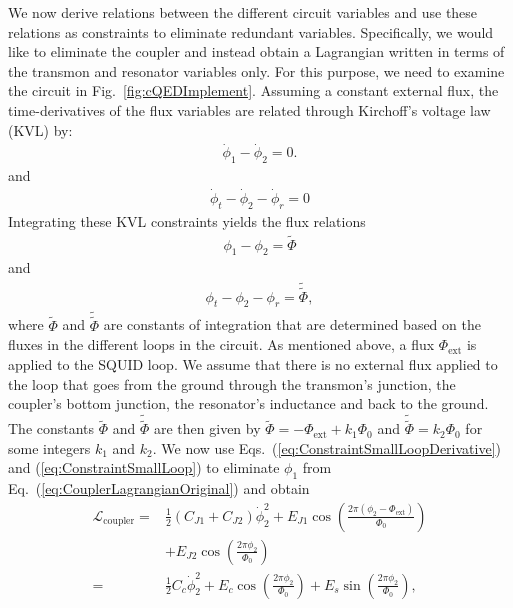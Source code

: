 We now derive relations between the different circuit variables and use these relations as constraints to eliminate redundant variables. Specifically, we would like to eliminate the coupler and instead obtain a Lagrangian written in terms of the transmon and resonator variables only. For this purpose, we need to examine the circuit in Fig.~\ref{fig:cQEDImplement}. Assuming a constant external flux, the time-derivatives of the flux variables are related through Kirchoff's voltage law (KVL) by:
\begin{align}
    \dot{\phi}_1-\dot{\phi}_2=0. \label{eq:ConstraintSmallLoopDerivative}
\end{align}
and
\begin{align}
    \dot{\phi}_t-\dot{\phi}_2-\dot{\phi}_r=0 \label{eq:ConstraintLargeLoopDerivative}
\end{align}
Integrating these KVL constraints yields the flux relations
\begin{align}
    \phi_1-\phi_2=\widetilde{\Phi} \label{eq:ConstraintSmallLoop}
\end{align}
and
\begin{align}
    {\phi}_t-{\phi}_2-{\phi}_r = \widetilde{\widetilde{\Phi}}, \label{eq:ConstraintLargeLoop}
\end{align}
where $\tilde{\Phi}$ and $\widetilde{\widetilde{\Phi}}$ are constants of integration that are determined based on the fluxes in the different loops in the circuit. As mentioned above, a flux $\Phi_{\text{ext}}$ is applied to the SQUID loop. We assume that there is no external flux applied to the loop that goes from the ground through the transmon's junction, the coupler's bottom junction, the resonator's inductance and back to the ground. The constants $\tilde{\Phi}$ and $\widetilde{\widetilde{\Phi}}$ are then given by $\widetilde{\Phi}= - \Phi_{\text{ext}} + k_1 \Phi_0$ and $\widetilde{\widetilde{\Phi}}=k_2 \Phi_0$ for some integers $k_1$ and $k_2$. 
We now use Eqs.~(\ref{eq:ConstraintSmallLoopDerivative}) and (\ref{eq:ConstraintSmallLoop}) to eliminate $\phi_1$ from Eq.~(\ref{eq:CouplerLagrangianOriginal}) and obtain
\begin{align}
    \mathcal{L}_{\text{coupler}}=&\frac{1}{2}(C_{J1} + C_{J2})\dot{\phi}_2^2 + E_{J1}\cos(\frac{2\pi (\phi_2 -\Phi_{\text{ext}})}{\Phi_0}) \nonumber \\ & + E_{J2}\cos(\frac{2\pi \phi_2}{\Phi_0}) \nonumber \\
    =&\frac{1}{2}C_c\dot{\phi}_2^2 + E_c\cos(\frac{2\pi \phi_2}{\Phi_0}) + E_s\sin(\frac{2\pi \phi_2}{\Phi_0}), \label{eq:CouplerLagrangianIntermediate}
\end{align}
